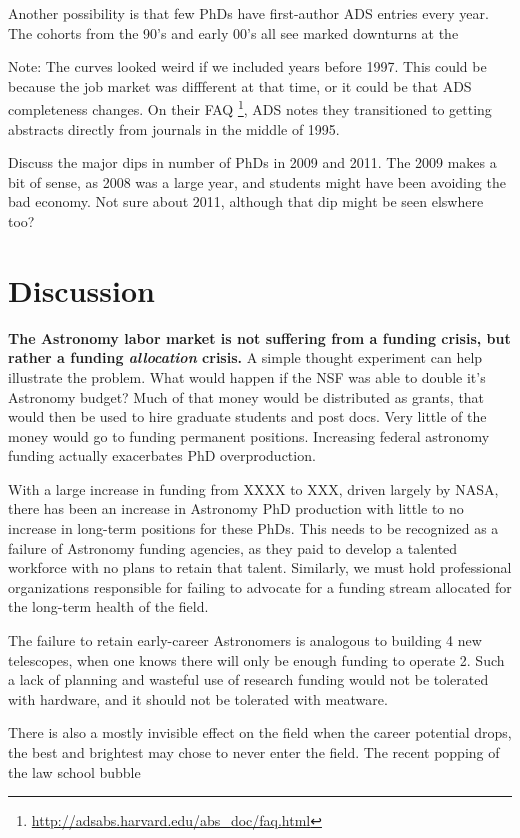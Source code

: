 \documentclass{emulateapj}
\begin{document}
Another possibility is that few PhDs have first-author ADS entries every year. The cohorts from the 90's and early 00's all see marked downturns at the

Note:  The curves looked weird if we included years before 1997. This could be because the job market was diffferent at that time, or it could be that ADS completeness changes. On their FAQ \footnote{\url{http://adsabs.harvard.edu/abs\_doc/faq.html}}, ADS notes they transitioned to getting abstracts directly from journals in the middle of 1995.

Discuss the major dips in number of PhDs in 2009 and 2011.  The 2009 makes a bit of sense, as 2008 was a large year, and students might have been avoiding the bad economy.  Not sure about 2011, although that dip might be seen elswhere too?

\section{Discussion}

{\bf{The Astronomy labor market is not suffering from a funding crisis, but rather a funding {\emph{allocation}} crisis.}} A simple thought experiment can help illustrate the problem. What would happen if the NSF was able to double it's Astronomy budget? Much of that money would be distributed as grants, that would then be used to hire graduate students and post docs. Very little of the money would go to funding permanent positions. Increasing federal astronomy funding actually exacerbates PhD overproduction. 

With a large increase in funding from XXXX to XXX, driven largely by NASA, there has been an increase in Astronomy PhD production with little to no increase in long-term positions for these PhDs.  This needs to be recognized as a failure of Astronomy funding agencies, as they paid to develop a talented workforce with no plans to retain that talent. Similarly, we must hold professional organizations responsible for failing to advocate for a funding stream allocated for the long-term health of the field.  

The failure to retain early-career Astronomers is analogous to building 4 new telescopes, when one knows there will only be enough funding to operate 2.  Such a lack of planning and wasteful use of research funding would not be tolerated with hardware, and it should not be tolerated with meatware. 

There is also a mostly invisible effect on the field when the career potential drops, the best and brightest may chose to never enter the field.  The recent popping of the law school bubble %
\end{document}
